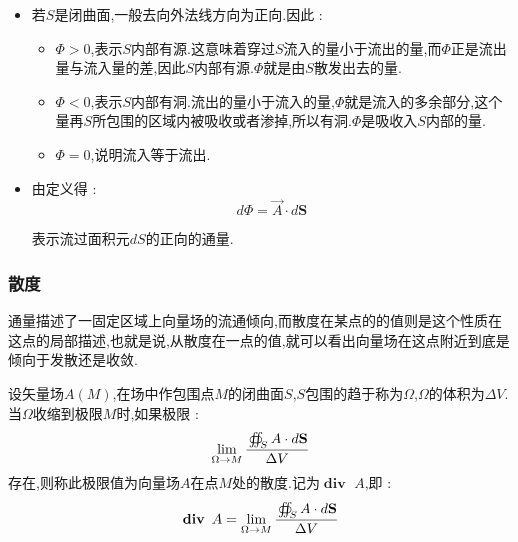 \documentclass[UTF8,12pt]{ctexbook}
\newcommand{\limNormal}[1]{\lim\limits_{#1}}
\newcommand{\doubleCurveIntegralOnZone}[1]{\oiint_{#1}}
\DeclareMathOperator{\divergenceText}{\mathbf{div}\ }
\begin{document}
{{{{{\begin{itemize}
{              在一个矢量场中,每点上的$\vec{A}$是确定对.$\varPhi$的正负与$\vec{n}$的制定有关.
              }
        \item {
              若$S$是闭曲面,一般去向外法线方向为正向.因此 :

              \begin{itemize}
                \item $\varPhi > 0$,表示$S$内部有源.这意味着穿过$S$流入的量小于流出的量,而$\varPhi$正是流出量与流入量的差,因此$S$内部有源.$\varPhi$就是由$S$散发出去的量.
                \item $\varPhi < 0$,表示$S$内部有洞.流出的量小于流入的量,$\varPhi$就是流入的多余部分,这个量再$S$所包围的区域内被吸收或者渗掉,所以有洞.$\varPhi$是吸收入$S$内部的量.
                \item $\varPhi = 0$,说明流入等于流出.
              \end{itemize}
              }
        \item {
              由定义得 :
              $$
                d\varPhi = \vec{A} \cdot d\mathbf{S}
              $$

              表示流过面积元$dS$的正向的通量.
              }
      \end{itemize}
    }%

    \subsubsection{散度}{
      通量描述了一固定区域上向量场的流通倾向,而散度在某点的的值则是这个性质在这点的局部描述,也就是说,从散度在一点的值,就可以看出向量场在这点附近到底是倾向于发散还是收敛.

      设矢量场$A(M)$,在场中作包围点$M$的闭曲面$S$,$S$包围的趋于称为$\Omega$,$\Omega$的体积为$\Delta V$.当$\Omega$收缩到极限$M$时,如果极限 :
      $$
        \limNormal{\Omega \to M}\cfrac{\doubleCurveIntegralOnZone{S}A \cdot d\mathbf{S}}{\Delta V}
      $$
      存在,则称此极限值为向量场$A$在点$M$处的散度.记为$\divergenceText A$,即 :
      $$
        \divergenceText A = \limNormal{\Omega \to M}\cfrac{\doubleCurveIntegralOnZone{S}A \cdot d\mathbf{S}}{\Delta V}
      $$

}}}}}
\end{document}

